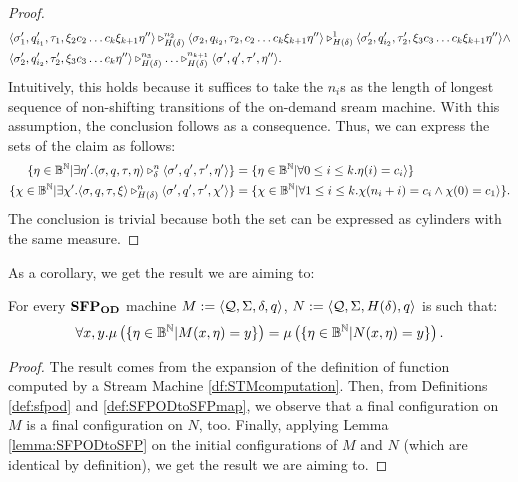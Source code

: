 \begin{proof}
\begin{align*}
     &\langle \sigma_1', q_{i_1}', \tau_1, \xi_2c_2\ldots c_k\xi_{k+1}\eta''\rangle  \triangleright^{n_2}_{H(\delta)} \langle \sigma_2, q_{i_2}, \tau_2, c_2\ldots c_k\xi_{k+1}\eta''\rangle\triangleright^{1}_{H(\delta)} \langle \sigma_2', q_{i_2}', \tau_2', \xi_3c_3\ldots c_k\xi_{k+1}\eta''\rangle \land \\
     &\langle \sigma_2', q_{i_2}', \tau_2', \xi_3c_3\ldots c_k\eta''\rangle \triangleright^{n_3}_{H(\delta)} \ldots \triangleright^{n_{k+1}}_{H(\delta)}
    \langle \sigma', q', \tau', \eta''\rangle.
  \end{align*}
  \normalsize
  Intuitively, this holds because it suffices to take the
  $n_i$s as the length of longest sequence of non-shifting transitions of the on-demand sream machine. With this assumption,
  the conclusion follows as a consequence.
  Thus, we can express the sets of the claim as follows:
  \begin{align*}
    \{\eta \in \mathbb{B}^{\mathbb{N}}| \exists \eta'. \langle \sigma, q, \tau, \eta\rangle\triangleright^{n}_{\delta} \langle \sigma', q', \tau', \eta'\rangle\} &= \{\eta \in \mathbb{B}^{\mathbb{N}}| \forall 0 \le i \le k. \eta(i) =c_i\rangle\}\\
    \{\chi \in \mathbb{B}^{\mathbb{N}}|  \exists \chi'. \langle \sigma, q, \tau, \xi\rangle\triangleright^{n}_{H(\delta)} \langle \sigma', q', \tau', \chi'\rangle\} &= \{\chi \in \mathbb{B}^{\mathbb{N}}| \forall 1 \le i \le k. \chi(n_i+i)=c_i\land \chi(0)=c_1 \rangle\}.
      \end{align*}
  The conclusion is trivial because both the set can be expressed as cylinders with the same measure.
\end{proof}
\noindent
As a corollary, we get the result we are aiming to:

\begin{cor}
  \label{cor:SFPODtoSFP}
  For every $\mathbf{SFP_{\mathbf{OD}}}$ machine $M := \langle \mathcal{Q}, \Sigma, \delta, q\rangle$,
  $N := \langle \mathcal{Q}, \Sigma, H(\delta), q\rangle$ is such that:
  $$
  \forall x, y. \mu\left (\{\eta \in \mathbb{B}^{\mathbb{N}} | M(x, \eta)=y\}\right)
  =
  \mu\left (\{\eta \in \mathbb{B}^{\mathbb{N}} | N(x, \eta)=y\}\right).
  $$
\end{cor}

\begin{proof}
  The result comes from the expansion of the definition of function computed
  by a Stream Machine \ref{df:STMcomputation}.
  Then, from Definitions \ref{def:sfpod} and \ref{def:SFPODtoSFPmap},
  we observe that
  a final configuration on $M$ is a final configuration on $N$, too.
  Finally, applying Lemma \ref{lemma:SFPODtoSFP} on the initial configurations of
  $M$ and $N$ (which are identical by definition),
  we get the result we are aiming to.
\end{proof}

